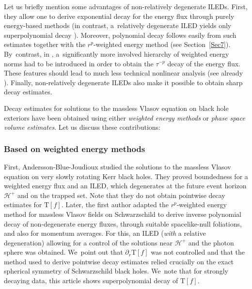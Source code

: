 \documentclass[10pt]{amsart}
\theoremstyle{plain}
\theoremstyle{definition}
\renewcommand\H{{\mathcal{H}^+}}
\begin{document}
Let us briefly mention some advantages of non-relatively degenerate ILEDs. First, they allow one to derive exponential decay for the energy flux through purely energy-based methods (in contrast, a~relatively degenerate ILED yields only superpolynomial decay \cite{DRSdS, L23}). Moreover, polynomial decay follows easily from such estimates together with the $r^p$-weighted energy method (see Section~\ref{Sec7}). By~contrast, in \cite{L23}, a~significantly more involved hierarchy of weighted energy norms had to be introduced in order to obtain the $\tau^{-p}$ decay of the energy flux. These features should lead to much less technical nonlinear analysis (see already \cite{Mavq}). Finally, non-relatively degenerate ILEDs also make it possible to obtain sharp decay estimates.


Decay estimates for solutions to the massless Vlasov equation on black hole exteriors have been obtained using either \emph{weighted energy methods} or \emph{phase space volume estimates}. Let us discuss these contributions:

\subsubsection{Based on weighted energy methods} First, Andersson-Blue-Joudioux \cite{ABJ} studied the solutions to the massless Vlasov equation on very slowly rotating Kerr black holes. They proved boundedness for a weighted energy flux and an ILED, which degenerates at the future event horizon $\H$ and on the trapped set. Note that they do not obtain pointwise decay estimates for $\mathrm{T}[f]$. Later, the first author \cite{L23} adapted the $r^p$-weighted energy method \cite{DR10} for massless Vlasov fields on Schwarzschild to derive inverse polynomial decay of non-degenerate energy fluxes, through suitable spacelike-null foliations, and also for momentum averages. For this, an ILED (\emph{with} a relative degeneration) allowing for a control of the solutions near $\H$ and the photon sphere was obtained. We~point out that $\partial_r \mathrm{T}[f]$ was not controlled and that the method used to derive pointwise decay estimates relied crucially on the exact spherical symmetry of Schwarzschild black holes. We~note that for strongly decaying data, this article shows superpolynomial decay of $\mathrm{T}[f]$.
\end{document}
